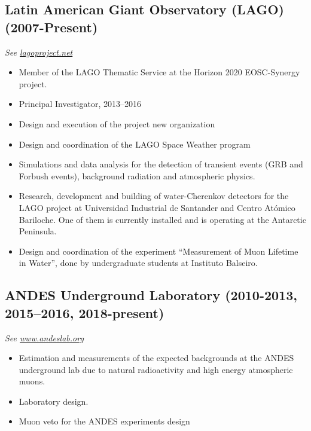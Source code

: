 \subsection*{Latin American Giant Observatory (LAGO) (2007-Present)}
{\small{\textit{See \href{http://lagoproject.net}{lagoproject.net}}}}
\begin{itemize}
\item Member of the LAGO Thematic Service at the Horizon 2020 EOSC-Synergy project.
\item Principal Investigator, 2013--2016
\item Design and execution of the project new organization
\item Design and coordination of the LAGO Space Weather program
\item Simulations and data analysis for the detection of transient events
(GRB and Forbush events), background radiation and atmospheric physics.
\item Research, development and building of water-Cherenkov detectors for the LAGO project at Universidad Industrial de Santander and Centro Atómico Bariloche.
	One of them is currently installed and is operating at the Antarctic Peninsula.
\item Design and coordination of the experiment ``Measurement of Muon Lifetime in Water'', done by undergraduate students at Instituto Balseiro.
\end{itemize}

\subsection*{ANDES Underground Laboratory (2010-2013, 2015--2016, 2018-present)}
{\small{\textit{See \href{http://www.andeslab.org}{www.andeslab.org}}}}
\begin{itemize}
\item Estimation and measurements of the expected backgrounds at the ANDES
underground lab due to natural radioactivity and high energy atmospheric muons.
\item Laboratory design.
\item Muon veto for the ANDES experiments design
\end{itemize}

\ifres
\else

